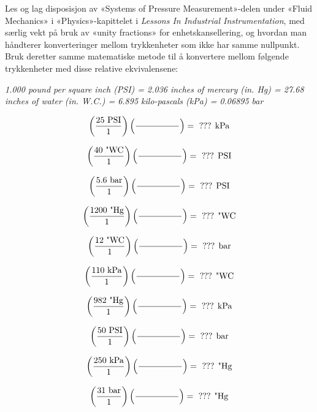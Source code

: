 
Les og lag disposisjon av «Systems of Pressure Measurement»-delen under «Fluid Mechanics» i «Physics»-kapittelet i {\it Lessons In Industrial Instrumentation}, med særlig vekt på bruk av «unity fractions» for enhetskansellering, og hvordan man håndterer konverteringer mellom trykkenheter som ikke har samme nullpunkt. Bruk deretter samme matematiske metode til å konvertere mellom følgende trykkenheter med disse relative ekvivalensene:

\vskip 10pt

\noindent
{\it 1.000 pound per square inch (PSI) = 2.036 inches of mercury (in. Hg) = 27.68 inches of water (in. W.C.) = 6.895 kilo-pascals (kPa) = 0.06895 bar}

$$\left(25 \hbox{ PSI} \over 1 \right) \left(\hbox{\hskip 50pt} \over \hbox{\hskip 50pt}\right) = \hbox{ ??? kPa} $$

$$\left(40 \hbox{ "WC} \over 1 \right) \left(\hbox{\hskip 50pt} \over \hbox{\hskip 50pt}\right) = \hbox{ ??? PSI} $$

$$\left(5.6 \hbox{ bar} \over 1 \right) \left(\hbox{\hskip 50pt} \over \hbox{\hskip 50pt}\right) = \hbox{ ??? PSI} $$

$$\left(1200 \hbox{ "Hg} \over 1 \right) \left(\hbox{\hskip 50pt} \over \hbox{\hskip 50pt}\right) = \hbox{ ??? "WC} $$

$$\left(12 \hbox{ "WC} \over 1 \right) \left(\hbox{\hskip 50pt} \over \hbox{\hskip 50pt}\right) = \hbox{ ??? bar} $$

$$\left(110 \hbox{ kPa} \over 1 \right) \left(\hbox{\hskip 50pt} \over \hbox{\hskip 50pt}\right) = \hbox{ ??? "WC} $$

$$\left(982 \hbox{ "Hg} \over 1 \right) \left(\hbox{\hskip 50pt} \over \hbox{\hskip 50pt}\right) = \hbox{ ??? kPa} $$

$$\left(50 \hbox{ PSI} \over 1 \right) \left(\hbox{\hskip 50pt} \over \hbox{\hskip 50pt}\right) = \hbox{ ??? bar} $$

$$\left(250 \hbox{ kPa} \over 1 \right) \left(\hbox{\hskip 50pt} \over \hbox{\hskip 50pt}\right) = \hbox{ ??? "Hg} $$

$$\left(31 \hbox{ bar} \over 1 \right) \left(\hbox{\hskip 50pt} \over \hbox{\hskip 50pt}\right) = \hbox{ ??? "Hg} $$

\vskip 10pt

